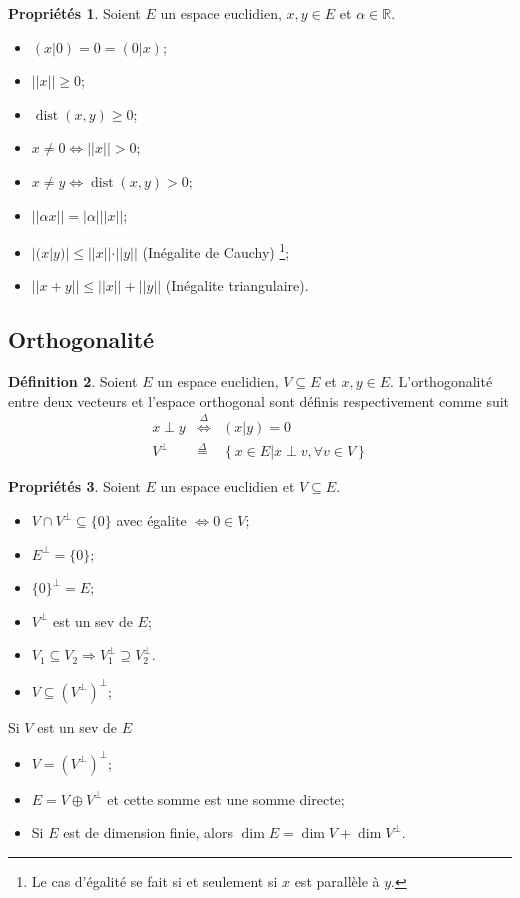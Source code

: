 \documentclass[11pt,a4paper]{article}
\theoremstyle{definition}
\newtheorem{mydef}{Définition}%
\newtheorem{myprop}[mydef]{Propriétés}
\DeclareMathOperator{\dist}{dist}
\newcommand{\eqdef}{\stackrel{\Delta}{=}}
\newcommand{\R}{\mathbb{R}}
\begin{document}
\begin{myprop}
	Soient $E$ un espace euclidien, $x,y \in E$ et $\alpha \in \R$.
	\begin{itemize}
		\item $(x|0) = 0 = (0|x)$;
		\item $||x|| \geq 0$;
		\item $\dist(x, y) \geq 0$;
		\item $x \neq 0 \iff ||x|| > 0$;
		\item $x \neq y \iff \dist(x, y) > 0$;
		\item $||\alpha x|| = |\alpha|||x||$;
		\item $|(x | y)| \leq ||x||\cdot||y||$ (Inégalite de Cauchy)
			\footnote{Le cas d'égalité se fait si et seulement si $x$ est parallèle à $y$.};
		\item $||x + y|| \leq ||x|| + ||y||$ (Inégalite triangulaire).
	\end{itemize}
\end{myprop}

\subsection{Orthogonalité}

\begin{mydef}
	Soient $E$ un espace euclidien, $V \subseteq E$ et $x,y \in E$.
	L'orthogonalité entre deux vecteurs et l'espace orthogonal sont définis respectivement comme suit
	\begin{eqnarray*}
		x \perp y & \stackrel{\Delta}{\Leftrightarrow} & (x|y) = 0\\
		V^{\perp} & \eqdef & \left\{x \in E | x \perp v, \forall v \in V\right\}
	\end{eqnarray*}
\end{mydef}

\begin{myprop}
	Soient $E$ un espace euclidien et $V \subseteq E$.
	\begin{itemize}
		\item $V \cap V^{\perp} \subseteq \{0\}$ avec égalite $\iff 0 \in V$;
		\item $E^{\perp} = \{0\}$;
		\item $\{0\}^{\perp} = E$;
		\item $V^{\perp}$ est un sev de $E$;
		\item $V_1 \subseteq V_2 \Rightarrow V_1^{\perp} \supseteq V_2^{\perp}$.
		\item $V \subseteq \left( V^{\perp} \right) ^{\perp}$;
	\end{itemize}
	Si $V$ est un sev de $E$
	\begin{itemize}
		\item $V = \left(V^\perp \right)^\perp$;
		\item $E = V \oplus V^{\perp}$ et cette somme est une somme directe;
			\item
			Si $E$ est de dimension finie, alors
			$\dim E = \dim V + \dim V^{\perp}$.
	\end{itemize}
\end{myprop}
\end{document}

